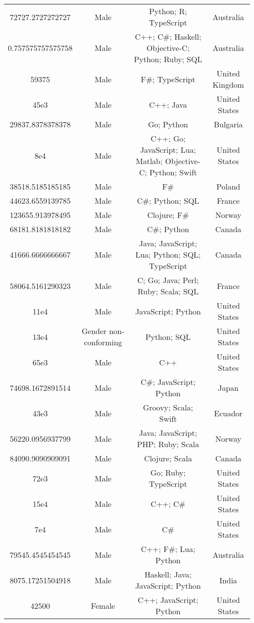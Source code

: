\begin{center}
\begin{tabular}{ |c|c|c|c| }
72727.2727272727  &  Male  &  Python; R; TypeScript  &  Australia  \\ 
0.757575757575758  &  Male  &  C++; C\#; Haskell; Objective-C; Python; Ruby; SQL  &  Australia  \\ 
59375  &  Male  &  F\#; TypeScript  &  United Kingdom  \\ 
45e3  &  Male  &  C++; Java  &  United States  \\ 
29837.8378378378  &  Male  &  Go; Python  &  Bulgaria  \\ 
8e4  &  Male  &  C++; Go; JavaScript; Lua; Matlab; Objective-C; Python; Swift  &  United States  \\ 
38518.5185185185  &  Male  &  F\#  &  Poland  \\ 
44623.6559139785  &  Male  &  C\#; Python; SQL  &  France  \\ 
123655.913978495  &  Male  &  Clojure; F\#  &  Norway  \\ 
68181.8181818182  &  Male  &  C\#; Python  &  Canada  \\ 
41666.6666666667  &  Male  &  Java; JavaScript; Lua; Python; SQL; TypeScript  &  Canada  \\ 
58064.5161290323  &  Male  &  C; Go; Java; Perl; Ruby; Scala; SQL  &  France  \\ 
11e4  &  Male  &  JavaScript; Python  &  United States  \\ 
13e4  &  Gender non-conforming  &  Python; SQL  &  United States  \\ 
65e3  &  Male  &  C++  &  United States  \\ 
74698.1672891514  &  Male  &  C\#; JavaScript; Python  &  Japan  \\ 
43e3  &  Male  &  Groovy; Scala; Swift  &  Ecuador  \\ 
56220.0956937799  &  Male  &  Java; JavaScript; PHP; Ruby; Scala  &  Norway  \\ 
84090.9090909091  &  Male  &  Clojure; Scala  &  Canada  \\ 
72e3  &  Male  &  Go; Ruby; TypeScript  &  United States  \\ 
15e4  &  Male  &  C++; C\#  &  United States  \\ 
7e4  &  Male  &  C\#  &  United States  \\ 
79545.4545454545  &  Male  &  C++; F\#; Lua; Python  &  Australia  \\ 
8075.17251504918  &  Male  &  Haskell; Java; JavaScript; Python  &  India  \\ 
42500  &  Female  &  C++; JavaScript; Python  &  United States  \\ 

\end{tabular}
\end{center}
